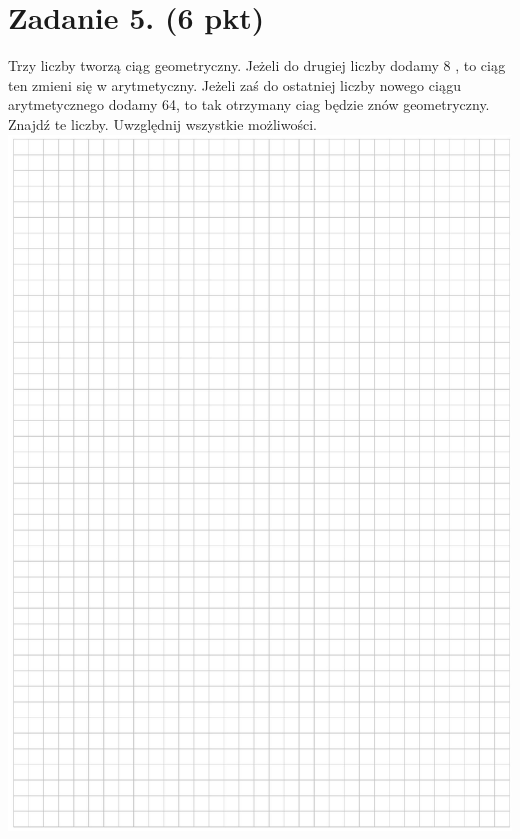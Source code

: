 \documentclass[10pt]{article}
\begin{document}
\section*{Zadanie 5. (6 pkt)}
Trzy liczby tworzą ciąg geometryczny. Jeżeli do drugiej liczby dodamy 8 , to ciąg ten zmieni się w arytmetyczny. Jeżeli zaś do ostatniej liczby nowego ciągu arytmetycznego dodamy 64, to tak otrzymany ciag będzie znów geometryczny. Znajdź te liczby. Uwzględnij wszystkie możliwości.\\
\includegraphics[max width=\textwidth, center]{2024_11_21_606d6e4e152fe3e9f6feg-08}\\
\end{document}

